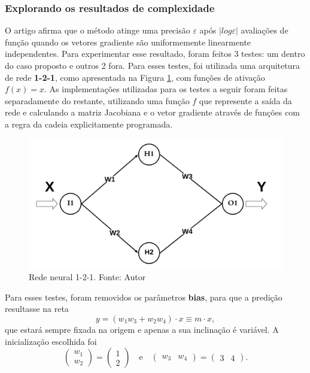 \documentclass[11pt]{article}
\begin{document}
\subsubsection*{Explorando os resultados de complexidade}
O artigo  \cite{bmLS} afirma que o método atinge uma precisão $\varepsilon$ após $|log \varepsilon|$ avaliações de função quando os vetores gradiente são uniformemente linearmente independentes. Para experimentar esse resultado, foram feitos 3 testes: um dentro do caso proposto e outros 2 fora. Para esses testes, foi utilizada uma arquitetura de rede \textbf{1-2-1}, como apresentada na Figura \ref{1-2-1}, com funções de ativação $f(x) = x$. As implementações utilizadas para os testes a seguir foram feitas separadamente do restante, utilizando uma função $f$ que represente a saída da rede e calculando a matriz Jacobiana e o vetor gradiente através de funções com a regra da cadeia explicitamente programada.
\begin{figure}[H]
\center
\includegraphics[scale=0.2]{Figuras/1-2-1.png}
\caption{Rede neural 1-2-1. Fonte: Autor} 
\label{1-2-1}
\end{figure}
Para esses testes, foram removidos os parâmetros \textbf{bias}, para que a predição resultasse na reta 
$$y = (w_1w_3 + w_2w_4)\cdot x \equiv m\cdot x,$$
que estará sempre fixada na origem e apenas a sua inclinação é variável. A inicialização escolhida foi $$\begin{pmatrix}w_1 \\ w_2\end{pmatrix} = \begin{pmatrix}1 \\ 2\end{pmatrix} \quad \text{e} \quad \begin{pmatrix}w_3 & w_4\end{pmatrix} = \begin{pmatrix}3 & 4\end{pmatrix}.$$
\end{document}
